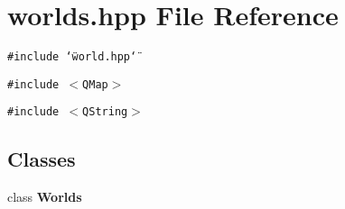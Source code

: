 \section{worlds.hpp File Reference}
\label{worlds_8hpp}
{\tt \#include \char`\"{}world.hpp\char`\"{}}\par
{\tt \#include $<$QMap$>$}\par
{\tt \#include $<$QString$>$}\par
\subsection*{Classes}
\begin{CompactItemize}
\item 
class {\bf Worlds}
\end{CompactItemize}
